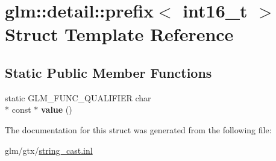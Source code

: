 \hypertarget{structglm_1_1detail_1_1prefix_3_01int16__t_01_4}{\section{glm\-:\-:detail\-:\-:prefix$<$ int16\-\_\-t $>$ Struct Template Reference}
\label{structglm_1_1detail_1_1prefix_3_01int16__t_01_4}
}
\subsection*{Static Public Member Functions}
\begin{DoxyCompactItemize}
\item 
\hypertarget{structglm_1_1detail_1_1prefix_3_01int16__t_01_4_a0ccbfcd8a1f5a2b777dbc43bad141bb6}{static G\-L\-M\-\_\-\-F\-U\-N\-C\-\_\-\-Q\-U\-A\-L\-I\-F\-I\-E\-R char \\*
const $\ast$ {\bfseries value} ()}\label{structglm_1_1detail_1_1prefix_3_01int16__t_01_4_a0ccbfcd8a1f5a2b777dbc43bad141bb6}

\end{DoxyCompactItemize}


The documentation for this struct was generated from the following file\-:\begin{DoxyCompactItemize}
\item 
glm/gtx/\hyperlink{string__cast_8inl}{string\-\_\-cast.\-inl}\end{DoxyCompactItemize}
